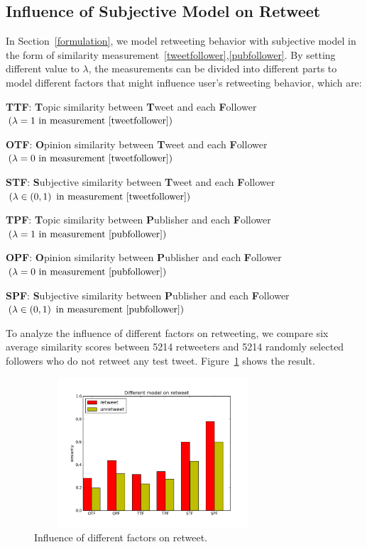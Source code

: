 \documentclass{acm_proc_article-sp}
\begin{document}
\subsection{Influence of Subjective  Model on Retweet}
\label{influence}
In Section~\ref{formulation},  we model retweeting behavior with subjective model in the form of similarity measurement~\ref{tweetfollower},\ref{pubfollower}.
By setting different value to $ \lambda $, the measurements can be divided into different parts to model different factors that might influence user's retweeting behavior, which are:
\begin{itemize*}
\item \textbf{TTF}: \textbf{T}opic similarity between \textbf{T}weet and each \textbf{F}ollower $ \left( \lambda =1  \text{ in measurement~\ref{tweetfollower}} \right) $ 
\item \textbf{OTF}: \textbf{O}pinion similarity between \textbf{T}weet and each \textbf{F}ollower $ \left( \lambda =0 \text{ in measurement~\ref{tweetfollower}} \right) $
\item \textbf{STF}: \textbf{S}ubjective similarity between \textbf{T}weet and each \textbf{F}ollower $ \left( \lambda \in \left( 0,1 \right)   \text{ in measurement~\ref{tweetfollower}} \right) $ 
\item \textbf{TPF}: \textbf{T}opic similarity between \textbf{P}ublisher and each \textbf{F}ollower $ \left( \lambda =1  \text{ in measurement~\ref{pubfollower}}  \right) $ 
\item \textbf{OPF}: \textbf{O}pinion similarity between \textbf{P}ublisher and each \textbf{F}ollower $ \left( \lambda =0 \text{ in measurement~\ref{pubfollower}} \right) $
\item \textbf{SPF}: \textbf{S}ubjective similarity between \textbf{P}ublisher and each \textbf{F}ollower $ \left( \lambda \in \left( 0,1 \right)   \text{ in measurement~\ref{pubfollower}} \right) $
\end{itemize*}
To analyze the influence of different factors on retweeting, we compare six average similarity scores between 5214 retweeters and 5214 randomly selected followers who do not retweet any test tweet. Figure~\ref{fig:graph6} shows the result.
\begin{figure}[htb]
\centering
\includegraphics[width=3.5in,height=2.2in]{component.pdf}
\caption{Influence of different factors on retweet.}
\label{fig:graph6}
\end{figure}
\end{document}
